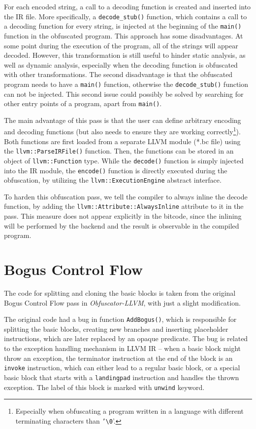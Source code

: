 \documentclass[
  digital, %
  notable,   %
  twoside, %
  nolof,     %
  nolot,     %
]{fithesis3}
\theoremstyle{definition}
\begin{document}
For each encoded string, a call to a decoding function is created and inserted into the IR file. More specifically, a \texttt{decode\_stub()} function, which contains a call to a decoding function for every string, is injected at the beginning of the \texttt{main()} function in the obfuscated program. This approach has some disadvantages. At some point during the execution of the program, all of the strings will appear decoded. However, this transformation is still useful to hinder static analysis, as well as dynamic analysis, especially when the decoding function is obfuscated with other transformations. The second disadvantage is that the obfuscated program needs to have a \texttt{main()} function, otherwise the \texttt{decode\_stub()} function can not be injected. This second issue could possibly be solved by searching for other entry points of a program, apart from \texttt{main()}.

The main advantage of this pass is that the user can define arbitrary encoding and decoding functions (but also needs to ensure they are working correctly\footnote{Especially when obfuscating a program written in a language with different terminating characters than \texttt{'\textbackslash0}'.}). Both functions are first loaded from a separate LLVM module (*.bc file) using the \texttt{llvm::ParseIRFile()} function. Then, the functions can be stored in an object of \texttt{llvm::Function} type. While the \texttt{decode()} function is simply injected into the IR module, the \texttt{encode()} function is directly executed during the obfuscation, by utilizing the \texttt{llvm::ExecutionEngine} abstract interface.

To harden this obfuscation pass, we tell the compiler to always inline the decode function, by adding the \texttt{llvm::Attribute::AlwaysInline} attribute to it in the pass. This measure does not appear explicitly in the bitcode, since the inlining will be performed by the backend and the result is observable in the compiled program. 

\section{Bogus Control Flow}
The code for splitting and cloning the basic blocks is taken from the original Bogus Control Flow pass in \textit{Obfuscator-LLVM}, with just a slight modification. 

The original code had a bug in function \texttt{AddBogus()}, which is responsible for splitting the basic blocks, creating new branches and inserting placeholder instructions, which are later replaced by an opaque predicate. The bug is related to the exception handling mechanism in LLVM IR -- when a basic block might throw an exception, the terminator instruction at the end of the block is an \texttt{invoke} instruction, which can either lead to a regular basic block, or a special basic block that starts with a \texttt{landingpad} instruction and handles the thrown exception. The label of this block is marked with \texttt{unwind} keyword. 
\end{document}
